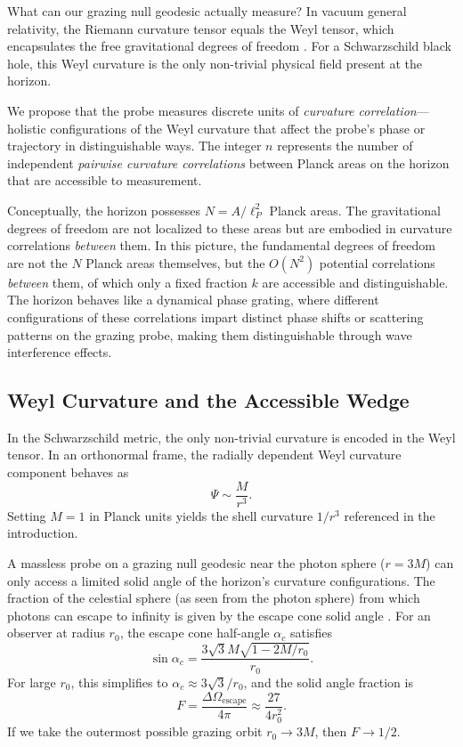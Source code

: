\documentclass[12pt, letterpaper]{article}
\begin{document}
What can our grazing null geodesic actually measure? In vacuum general relativity, the Riemann curvature tensor equals the Weyl tensor, which encapsulates the free gravitational degrees of freedom \cite{MTW1973}. For a Schwarzschild black hole, this Weyl curvature is the only non-trivial physical field present at the horizon.

We propose that the probe measures discrete units of \emph{curvature correlation}—holistic configurations of the Weyl curvature that affect the probe's phase or trajectory in distinguishable ways. The integer $n$ represents the number of independent \emph{pairwise curvature correlations} between Planck areas on the horizon that are accessible to measurement.

Conceptually, the horizon possesses $N = A/\ell_P^2$ Planck areas. The gravitational degrees of freedom are not localized to these areas but are embodied in curvature correlations \emph{between} them. In this picture, the fundamental degrees of freedom are not the $N$ Planck areas themselves, but the $O(N^2)$ potential correlations \emph{between} them, of which only a fixed fraction $k$ are accessible and distinguishable. The horizon behaves like a dynamical phase grating, where different configurations of these correlations impart distinct phase shifts or scattering patterns on the grazing probe, making them distinguishable through wave interference effects.

\subsection{Weyl Curvature and the Accessible Wedge}

In the Schwarzschild metric, the only non-trivial curvature is encoded in the Weyl tensor. In an orthonormal frame, the radially dependent Weyl curvature component behaves as
\[
\Psi \sim \frac{M}{r^3}.
\]
Setting $M=1$ in Planck units yields the shell curvature $1/r^3$ referenced in the introduction.

A massless probe on a grazing null geodesic near the photon sphere ($r = 3M$) can only access a limited solid angle of the horizon's curvature configurations. The fraction of the celestial sphere (as seen from the photon sphere) from which photons can escape to infinity is given by the escape cone solid angle \cite{MTW1973}. For an observer at radius $r_0$, the escape cone half-angle $\alpha_c$ satisfies
\[
\sin \alpha_c = \frac{3\sqrt{3}M \sqrt{1 - 2M/r_0}}{r_0}.
\]
For large $r_0$, this simplifies to $\alpha_c \approx 3\sqrt{3}/r_0$, and the solid angle fraction is
\[
F = \frac{\Delta\Omega_{\text{escape}}}{4\pi} \approx \frac{27}{4 r_0^2}.
\]
If we take the outermost possible grazing orbit $r_0 \to 3M$, then $F \to 1/2$.
\end{document}

